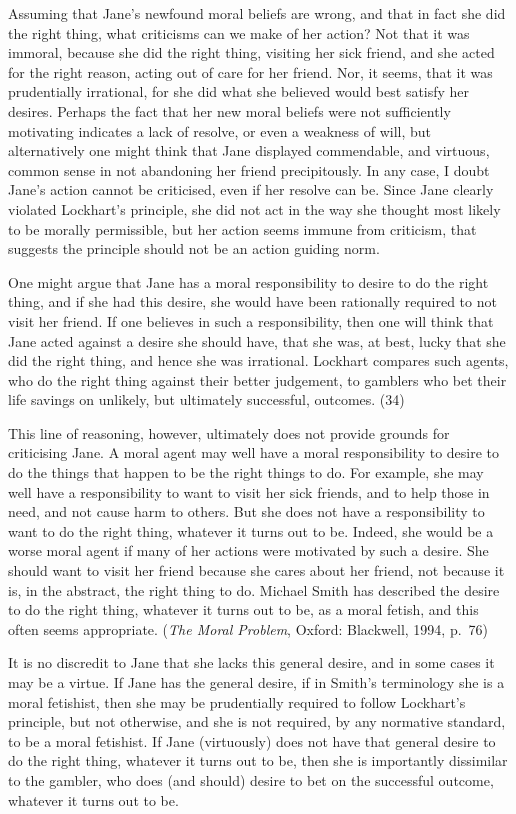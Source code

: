 \documentclass[
  10pt,
  letterpaper,
  DIV=11,
  numbers=noendperiod,
  twoside]{scrartcl}
\begin{document}
Assuming that Jane's newfound moral beliefs are wrong, and that in fact
she did the right thing, what criticisms can we make of her action? Not
that it was immoral, because she did the right thing, visiting her sick
friend, and she acted for the right reason, acting out of care for her
friend. Nor, it seems, that it was prudentially irrational, for she did
what she believed would best satisfy her desires. Perhaps the fact that
her new moral beliefs were not sufficiently motivating indicates a lack
of resolve, or even a weakness of will, but alternatively one might
think that Jane displayed commendable, and virtuous, common sense in not
abandoning her friend precipitously. In any case, I doubt Jane's action
cannot be criticised, even if her resolve can be. Since Jane clearly
violated Lockhart's principle, she did not act in the way she thought
most likely to be morally permissible, but her action seems immune from
criticism, that suggests the principle should not be an action guiding
norm.

One might argue that Jane has a moral responsibility to desire to do the
right thing, and if she had this desire, she would have been rationally
required to not visit her friend. If one believes in such a
responsibility, then one will think that Jane acted against a desire she
should have, that she was, at best, lucky that she did the right thing,
and hence she was irrational. Lockhart compares such agents, who do the
right thing against their better judgement, to gamblers who bet their
life savings on unlikely, but ultimately successful, outcomes. (34)

This line of reasoning, however, ultimately does not provide grounds for
criticising Jane. A moral agent may well have a moral responsibility to
desire to do the things that happen to be the right things to do. For
example, she may well have a responsibility to want to visit her sick
friends, and to help those in need, and not cause harm to others. But
she does not have a responsibility to want to do the right thing,
whatever it turns out to be. Indeed, she would be a worse moral agent if
many of her actions were motivated by such a desire. She should want to
visit her friend because she cares about her friend, not because it is,
in the abstract, the right thing to do. Michael Smith has described the
desire to do the right thing, whatever it turns out to be, as a moral
fetish, and this often seems appropriate. (\emph{The Moral Problem},
Oxford: Blackwell, 1994, p.~76)

It is no discredit to Jane that she lacks this general desire, and in
some cases it may be a virtue. If Jane has the general desire, if in
Smith's terminology she is a moral fetishist, then she may be
prudentially required to follow Lockhart's principle, but not otherwise,
and she is not required, by any normative standard, to be a moral
fetishist. If Jane (virtuously) does not have that general desire to do
the right thing, whatever it turns out to be, then she is importantly
dissimilar to the gambler, who does (and should) desire to bet on the
successful outcome, whatever it turns out to be.
\end{document}

